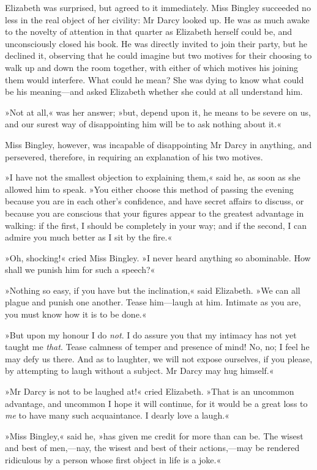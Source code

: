 Elizabeth was surprised, but agreed to it immediately. Miss Bingley succeeded no less in the real object of her civility: Mr Darcy looked up. He was as much awake to the novelty of attention in that quarter as Elizabeth herself could be, and unconsciously closed his book. He was directly invited to join their party, but he declined it, observing that he could imagine but two motives for their choosing to walk up and down the room together, with either of which motives his joining them would interfere. What could he mean? She was dying to know what could be his meaning—and asked Elizabeth whether she could at all understand him.

»Not at all,« was her answer; »but, depend upon it, he means to be severe on us, and our surest way of disappointing him will be to ask nothing about it.«

Miss Bingley, however, was incapable of disappointing Mr Darcy in anything, and persevered, therefore, in requiring an explanation of his two motives.

»I have not the smallest objection to explaining them,« said he, as soon as she allowed him to speak. »You either choose this method of passing the evening because you are in each other's confidence, and have secret affairs to discuss, or because you are conscious that your figures appear to the greatest advantage in walking: if the first, I should be completely in your way; and if the second, I can admire you much better as I sit by the fire.«

»Oh, shocking!« cried Miss Bingley. »I never heard anything so abominable. How shall we punish him for such a speech?«

»Nothing so easy, if you have but the inclination,« said Elizabeth. »We can all plague and punish one another. Tease him—laugh at him. Intimate as you are, you must know how it is to be done.«

»But upon my honour I do \textit{not}. I do assure you that my intimacy has not yet taught me \textit{that}. Tease calmness of temper and presence of mind! No, no; I feel he may defy us there. And as to laughter, we will not expose ourselves, if you please, by attempting to laugh without a subject. Mr Darcy may hug himself.«

»Mr Darcy is not to be laughed at!« cried Elizabeth. »That is an uncommon advantage, and uncommon I hope it will continue, for it would be a great loss to \textit{me} to have many such acquaintance. I dearly love a laugh.«

»Miss Bingley,« said he, »has given me credit for more than can be. The wisest and best of men,—nay, the wisest and best of their actions,—may be rendered ridiculous by a person whose first object in life is a joke.«

